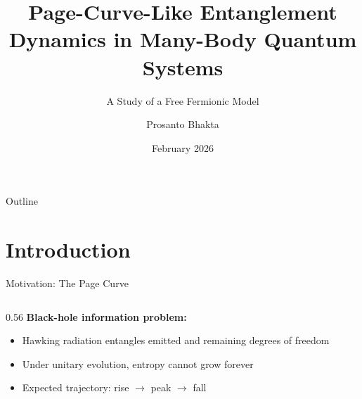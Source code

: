 \documentclass[aspectratio=169,11pt]{beamer}
\title[Page Curve Entanglement]{Page-Curve-Like Entanglement Dynamics in Many-Body Quantum Systems}
\subtitle{A Study of a Free Fermionic Model}
\author[P. Bhakta]{Prosanto Bhakta}
\institute[IUB]{Department of Physical Sciences, Independent University Bangladesh}
\date{February 2026}
\begin{document}
\begin{frame}[plain]
    \titlepage
\end{frame}

\begin{frame}{Outline}
    \tableofcontents
\end{frame}

\section{Introduction}

\begin{frame}{Motivation: The Page Curve}
    \begin{columns}
        \begin{column}{0.56\textwidth}
            \textbf{Black-hole information problem:}
            \begin{itemize}
                \item Hawking radiation entangles emitted and remaining degrees of freedom
                \item Under unitary evolution, entropy cannot grow forever
                \item Expected trajectory: rise $\rightarrow$ peak $\rightarrow$ fall
            \end{itemize}


\end{column}
\end{columns}
\end{frame}
\end{document}
